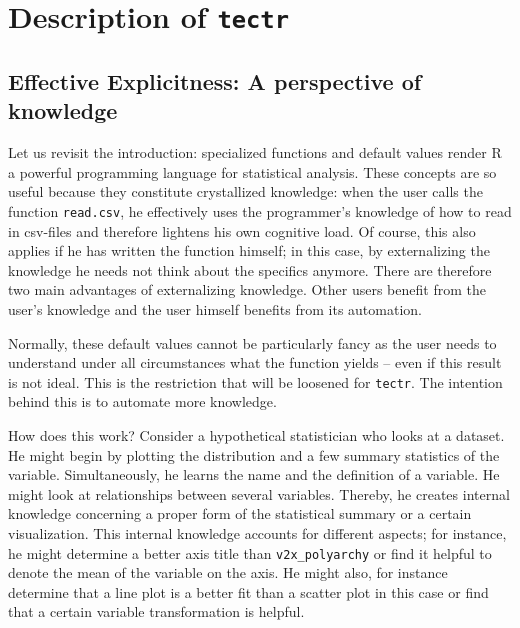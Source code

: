 \documentclass[]{report}
\theoremstyle{definition}
\theoremstyle{definition}
\theoremstyle{definition}
\theoremstyle{remark}
\begin{document}
\hypertarget{concept}{\chapter{\texorpdfstring{Description of
\texttt{tectr}}{Description of tectr}}\label{concept}}

\section{Effective Explicitness: A perspective of
knowledge}\label{effective-explicitness-a-perspective-of-knowledge}

Let us revisit the introduction: specialized functions and default
values render R a powerful programming language for statistical
analysis. These concepts are so useful because they constitute
crystallized knowledge: when the user calls the function
\texttt{read.csv}, he effectively uses the programmer's knowledge of how
to read in csv-files and therefore lightens his own cognitive load. Of
course, this also applies if he has written the function himself; in
this case, by externalizing the knowledge he needs not think about the
specifics anymore. There are therefore two main advantages of
externalizing knowledge. Other users benefit from the user's knowledge
and the user himself benefits from its automation.

Normally, these default values cannot be particularly fancy as the user
needs to understand under all circumstances what the function yields --
even if this result is not ideal. This is the restriction that will be
loosened for \texttt{tectr}. The intention behind this is to automate
more knowledge.

How does this work? Consider a hypothetical statistician who looks at a
dataset. He might begin by plotting the distribution and a few summary
statistics of the variable. Simultaneously, he learns the name and the
definition of a variable. He might look at relationships between several
variables. Thereby, he creates internal knowledge concerning a proper
form of the statistical summary or a certain visualization. This
internal knowledge accounts for different aspects; for instance, he
might determine a better axis title than \texttt{v2x\_polyarchy} or find
it helpful to denote the mean of the variable on the axis. He might
also, for instance determine that a line plot is a better fit than a
scatter plot in this case or find that a certain variable transformation
is helpful.
\end{document}

